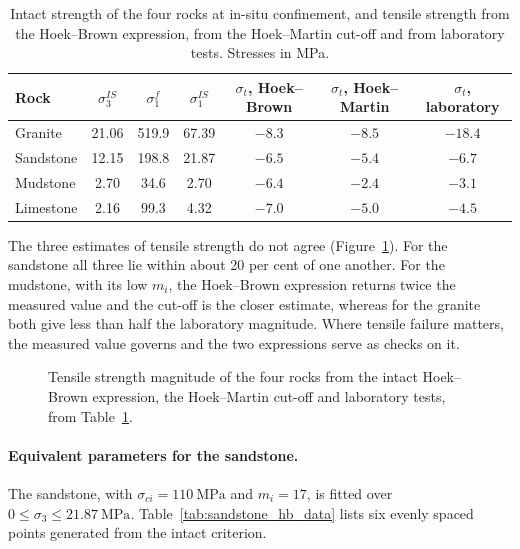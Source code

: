 \begin{table}[htbp]
\caption{Intact strength of the four rocks at in-situ confinement, and
tensile strength from the Hoek--Brown expression, from the Hoek--Martin
cut-off and from laboratory tests. Stresses in MPa.}
\label{tab:intact_strength_results}
\centering
\small
\begin{tabular}{l c c c c c c}
\toprule
\textbf{Rock} & \(\sigma_3^{IS}\) & \(\sigma_1^f\) & \(\sigma_1^{IS}\)
 & \(\sigma_t\), Hoek--Brown & \(\sigma_t\), Hoek--Martin & \(\sigma_t\), laboratory \\
\midrule
Granite & 21.06 & 519.9 & 67.39 & \(-8.3\) & \(-8.5\) & \(-18.4\) \\
Sandstone & 12.15 & 198.8 & 21.87 & \(-6.5\) & \(-5.4\) & \(-6.7\) \\
Mudstone & 2.70 & 34.6 & 2.70 & \(-6.4\) & \(-2.4\) & \(-3.1\) \\
Limestone & 2.16 & 99.3 & 4.32 & \(-7.0\) & \(-5.0\) & \(-4.5\) \\
\bottomrule
\end{tabular}
\end{table}

The three estimates of tensile strength do not agree
(Figure~\ref{fig:tensile-four-rocks}). For the sandstone all
three lie within about 20 per cent of one another. For the mudstone, with its
low \(m_i\), the Hoek--Brown expression returns twice the measured value and
the cut-off is the closer estimate, whereas for the granite both give less
than half the laboratory magnitude. Where tensile failure matters, the measured
value governs and the two expressions serve as checks on it.

\begin{figure}[htbp]
\centering
{}
\caption{Tensile strength magnitude of the four rocks from the intact Hoek--Brown expression, the Hoek--Martin cut-off and laboratory tests, from Table~\ref{tab:intact_strength_results}.}
\label{fig:tensile-four-rocks}
\end{figure}

\paragraph{Equivalent parameters for the sandstone.}
The sandstone, with \(\sigma_{ci}=110~\text{MPa}\) and \(m_i=17\), is fitted
over \(0 \leq \sigma_3 \leq 21.87~\text{MPa}\).
Table~\ref{tab:sandstone_hb_data} lists six evenly spaced points generated
from the intact criterion.

